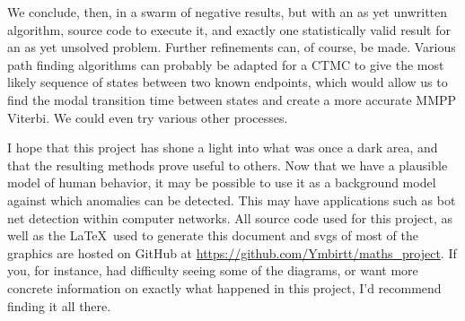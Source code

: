 We conclude, then, in a swarm of negative results, but with an as yet unwritten algorithm, source code to execute it, and exactly one statistically valid result for an as yet unsolved problem. Further refinements can, of course, be made. Various path finding algorithms can probably be adapted for a CTMC to give the most likely sequence of states between two known endpoints, which would allow us to find the modal transition time between states and create a more accurate MMPP Viterbi. We could even try various other processes.

I hope that this project has shone a light into what was once a dark area, and that the resulting methods prove useful to others. Now that we have a plausible model of human behavior, it may be possible to use it as a background model against which anomalies can be detected. This may have applications such as bot net detection within computer networks. All source code used for this project, as well as the \LaTeX \, used to generate this document and svgs of most of the graphics are hosted on GitHub at \url{https://github.com/Ymbirtt/maths_project}. If you, for instance, had difficulty seeing some of the diagrams, or want more concrete information on exactly what happened in this project, I'd recommend finding it all there. 